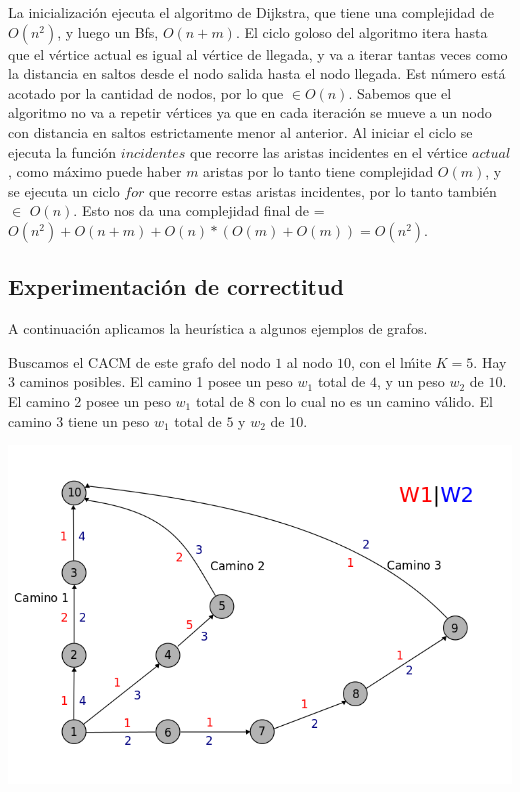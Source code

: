 La inicializaci\'on ejecuta el algoritmo de Dijkstra, que tiene una complejidad de $O(n^2)$, y luego un Bfs, $O(n+m)$. El ciclo goloso del algoritmo itera hasta que el v\'ertice actual es igual al v\'ertice de llegada, y va a iterar tantas veces como la distancia en saltos desde el nodo salida hasta el nodo llegada. Est n\'umero est\'a acotado por la cantidad de nodos, por lo que $\in O(n)$. Sabemos que el algoritmo no va a repetir v\'ertices ya que  en cada iteraci\'on se mueve a un nodo con distancia en saltos estrictamente menor al anterior. Al iniciar el ciclo se ejecuta la funci\'on $incidentes$ que recorre las aristas incidentes en el v\'ertice $actual$, como m\'aximo puede haber $m$ aristas por lo tanto tiene complejidad $O(m)$, y se ejecuta un ciclo $for$ que recorre estas aristas incidentes, por lo tanto tambi\'en $\in$ $O(n)$. Esto nos da una complejidad final de = $ O(n^2)+ O(n+m)+ O(n)*(O(m)+O(m)) = O(n^2)$. 

\subsection{Experimentaci\'on de correctitud}

A continuaci\'on aplicamos la heur\'istica a algunos ejemplos de grafos.

\vspace{10mm}

Buscamos el CACM de este grafo del nodo $1$ al nodo $10$, con el l\'mite $K = 5$. Hay 3 caminos posibles. El camino 1 posee un peso $w_1$ total de $4$, y un peso $w_2$ de $10$. El camino 2 posee un peso $w_1$ total de $8$ con lo cual no es un camino v\'alido. El camino 3 tiene un peso $w_1$ total de $5$ y $w_2$ de $10$.


\begin{center}
\includegraphics[scale=0.5]{img/grafoGoloso1.png}
\end{center}


